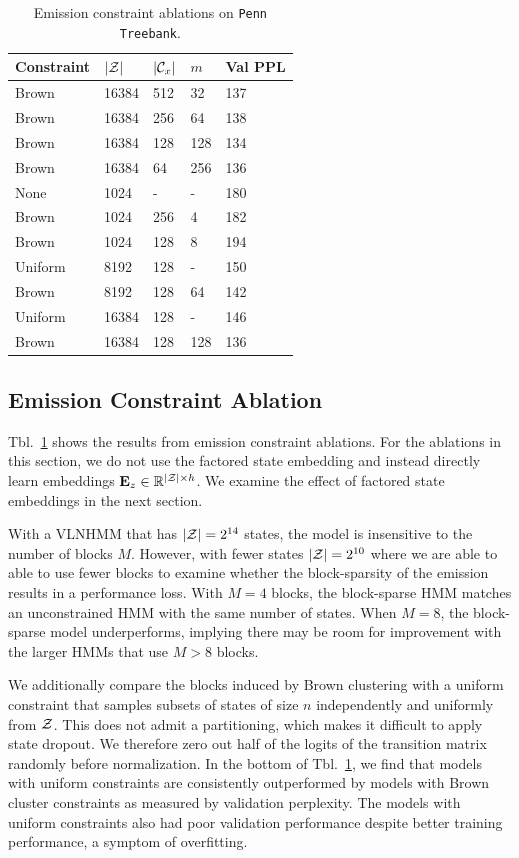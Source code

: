 \documentclass[11pt,a4paper]{article}
\begin{document}
\begin{table}[t]
\centering
\begin{tabular}{lllll}
\toprule
Constraint & $|\mathcal{Z}|$ & $|\mathcal{C}_x|$ & $m$ & Val PPL\\
\midrule
Brown & 16384 & 512 & 32  & 137\\
Brown & 16384 & 256 & 64  & 138\\
Brown & 16384 & 128 & 128 & 134\\
Brown & 16384 & 64  & 256 & 136\\
\midrule
None  & 1024 & - & - & 180\\
Brown & 1024 & 256 & 4 & 182\\
Brown & 1024 & 128 & 8 & 194\\
\midrule
Uniform    & 8192    & 128    & -   & 150\\
Brown      & 8192    & 128    & 64  & 142\\
Uniform    & 16384   & 128    & -   & 146\\
Brown      & 16384   & 128    & 128 & 136\\
\bottomrule
\end{tabular}
\caption{\label{tbl:constraint-ablation}
Emission constraint ablations on \texttt{Penn Treebank}.
}
\end{table}


\subsection{Emission Constraint Ablation}
Tbl.~\ref{tbl:constraint-ablation} shows the results from 
emission constraint ablations.
For the ablations in this section,
we do not use the factored state embedding
and instead directly learn embeddings $\mathbf{E}_z\in\mathbb{R}^{|\mathcal{Z}|\times h}$.
We examine the effect of factored state embeddings in the next section.

With a VLNHMM that has $|\mathcal{Z}|=2^{14}$ states,
the model is insensitive to the number of blocks $M$.
However, with fewer states $|\mathcal{Z}|=2^{10}$ where we are able to
able to use fewer blocks to examine whether the block-sparsity
of the emission results in a performance loss.
With $M=4$ blocks, the block-sparse HMM matches an unconstrained HMM
with the same number of states.
When $M=8$, the block-sparse model underperforms,
implying there may be room for improvement with the larger
HMMs that use $M > 8$ blocks.

We additionally compare the blocks induced by Brown clustering with a uniform
constraint that samples subsets of states of size $n$
independently and uniformly from $\mathcal{Z}$.
This does not admit a partitioning, which makes it difficult to apply state dropout.
We therefore zero out half of the logits of the transition matrix randomly
before normalization.
In the bottom of Tbl.~\ref{tbl:constraint-ablation},
we find that models with uniform constraints
are consistently outperformed by models with Brown cluster constraints
as measured by validation perplexity.
The models with uniform constraints also had poor validation performance
despite better training performance, a symptom of overfitting.
\end{document}
